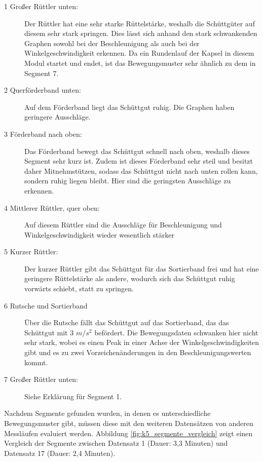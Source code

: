 \begin{description}
	\item [1 Großer Rüttler unten:] Der Rüttler hat eine sehr starke Rüttelstärke, weshalb die Schüttgüter auf diesem sehr stark springen. Dies lässt sich anhand den stark schwankenden Graphen sowohl bei der Beschleunigung als auch bei der Winkelgeschwindigkeit erkennen. Da ein Rundenlauf der Kapsel in diesem Modul startet und endet, ist das Bewegungsmuster sehr ähnlich zu dem in Segment 7.
	\item [2 Querförderband unten:] Auf dem Förderband liegt das Schüttgut ruhig. Die Graphen haben geringere Ausschläge. 
	\item [3 Förderband nach oben:] Das Förderband bewegt das Schüttgut schnell nach oben, weshalb dieses Segment sehr kurz ist. Zudem ist dieses Förderband sehr steil und besitzt daher Mitnehmstützen, sodass das Schüttgut nicht nach unten rollen kann, sondern ruhig liegen bleibt. Hier sind die geringsten Ausschläge zu erkennen.
	\item [4 Mittlerer Rüttler, quer oben:] Auf diesem Rüttler sind die Ausschläge für Beschleunigung und Winkelgeschwindigkeit wieder wesentlich stärker
	\item [5 Kurzer Rüttler:] Der kurzer Rüttler gibt das Schüttgut für das Sortierband frei und hat eine geringere Rüttelstärke als andere, wodurch sich das Schüttgut ruhig vorwärts schiebt, statt zu springen.
	\item [6 Rutsche und Sortierband] Über die Rutsche fällt das Schüttgut auf das Sortierband, das das Schüttgut mit 3 $m/s^{2}$ befördert. Die Bewegungsdaten schwanken hier nicht sehr stark, wobei es einen Peak in einer Achse der Winkelgeschwindigkeiten gibt und es zu zwei Vorzeichenänderungen in den Beschleunigungswerten kommt.   
	\item [7 Großer Rüttler unten:] Siehe Erklärung für Segment 1.	
\end{description}

Nachdem Segmente gefunden wurden, in denen es unterschiedliche Bewegungsmuster gibt, müssen diese mit den weiteren Datensätzen von anderen Messläufen evaluiert werden. Abbildung \ref{fig:k5_segmente_vergleich} zeigt einen Vergleich der Segmente zwischen Datensatz 1 (Dauer: 3,3 Minuten) und Datensatz 17 (Dauer: 2,4 Minuten). 

